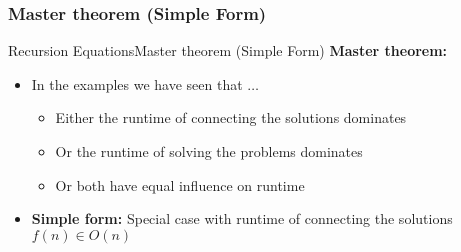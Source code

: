
\subsubsection{Master theorem (Simple Form)}

\begin{frame}{Recursion Equations}{Master theorem (Simple Form)}
  \textbf{Master theorem:}
  \begin{itemize}
    \item<2->
      In the examples we have seen that $\ldots$
      \begin{itemize}
        \item<3->
          Either the runtime of {\color{Mittel-Blau}connecting the solutions}
          dominates
        \item<4->
          Or the runtime of {\color{Mittel-Blau}solving the problems} dominates
        \item<5->
          Or both have {\color{Mittel-Blau}equal influence on runtime}
      \end{itemize}
    \item<6->
      \textbf{Simple form:}
      Special case with runtime of connecting the solutions
      {\color{Mittel-Blau}$f(n) \in O(n)$}
  \end{itemize}
\end{frame}


